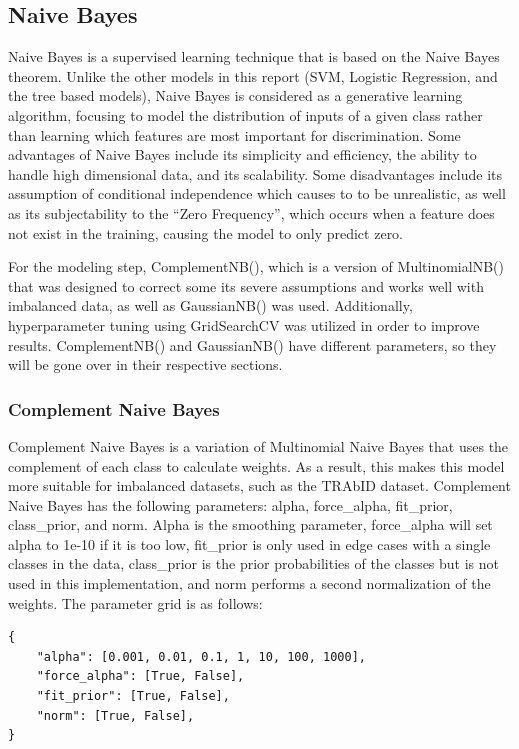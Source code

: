\subsection{Naive Bayes}
Naive Bayes is a supervised learning technique that is based on the Naive Bayes theorem. Unlike the other models in this report (SVM, Logistic Regression, and the tree based models), Naive Bayes is considered as a generative learning algorithm, focusing to model the distribution of inputs of a given class rather than learning which features are most important for discrimination. Some advantages of Naive Bayes include its simplicity and efficiency, the ability to handle high dimensional data, and its scalability. Some disadvantages include its assumption of conditional independence which causes to to be unrealistic, as well as its subjectability to the ``Zero Frequency'', which occurs when a feature does not exist in the training, causing the model to only predict zero.

For the modeling step, ComplementNB(), which is a version of MultinomialNB() that was designed to correct some its severe assumptions and works well with imbalanced data, as well as GaussianNB() was used. Additionally, hyperparameter tuning using GridSearchCV was utilized in order to improve results. ComplementNB() and GaussianNB() have different parameters, so they will be gone over in their respective sections.

\subsubsection{Complement Naive Bayes}
Complement Naive Bayes is a variation of Multinomial Naive Bayes that uses the complement of each class to calculate weights. As a result, this makes this model more suitable for imbalanced datasets, such as the TRAbID dataset. Complement Naive Bayes has the following parameters: alpha, force\_alpha, fit\_prior, class\_prior, and norm. Alpha is the smoothing parameter, force\_alpha will set alpha to 1e-10 if it is too low, fit\_prior is only used in edge cases with a single classes in the data, class\_prior is the prior probabilities of the classes but is not used in this implementation, and norm performs a second normalization of the weights. The parameter grid is as follows: 

\begin{lstlisting}
{
    "alpha": [0.001, 0.01, 0.1, 1, 10, 100, 1000],
    "force_alpha": [True, False],
    "fit_prior": [True, False],
    "norm": [True, False],
}
\end{lstlisting}

